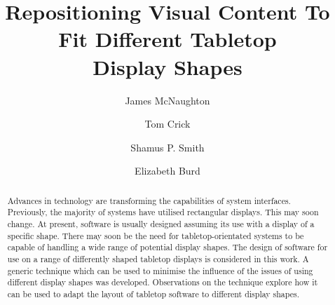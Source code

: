 \documentclass[review,5p,times,twocolumn]{elsarticle}
\begin{document}
\begin{frontmatter}



\title{Repositioning Visual Content To Fit Different Tabletop\\Display Shapes}


\author[durham]{James McNaughton}
\author[cardiff]{Tom Crick}
\author[newcastleEng]{Shamus P. Smith}
\author[newcastleCha]{Elizabeth Burd}


\address[durham]{Technology Enhanced Learning Special Interest Group, School of Education, Durham University, South Road, Durham, DH1 3LE, UK}
\address[cardiff]{Department of Computing \& Information Systems, Cardiff Metropolitan University, Cardiff, CF5 2YB, UK}
\address[newcastleEng]{ES248, Callaghan, University Drive, Callaghan NSW 2308, Australia}
\address[newcastleCha]{CH320A, The Chancellery, Callaghan, University Drive, Callaghan NSW 2308, Australia}


\begin{abstract}
Advances in technology are transforming the capabilities of system interfaces.
Previously, the majority of systems have utilised rectangular displays.
This may soon change.
At present, software is usually designed assuming its use with a display of a specific shape.
There may soon be the need for tabletop-orientated systems to be capable of handling a wide range of potential display shapes.
The design of software for use on a range of differently shaped tabletop displays is considered in this work.
A generic technique which can be used to minimise the influence of the issues of using different display shapes was developed.
Observations on the technique explore how it can be used to adapt the layout of tabletop software to different display shapes.
\end{abstract}



\end{frontmatter}
\end{document}
